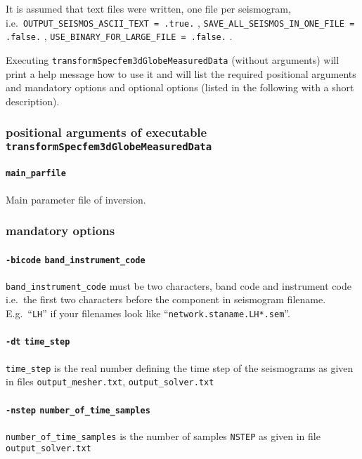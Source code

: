 \documentclass[12pt,a4paper]{article}
\newcommand{\lcode}[1]{\nolinkurl{#1}}
\begin{document}
It is assumed that text files were written, one file per seismogram, 
i.e.\ \lcode{OUTPUT_SEISMOS_ASCII_TEXT = .true.} , \lcode{SAVE_ALL_SEISMOS_IN_ONE_FILE = .false.} , 
\lcode{USE_BINARY_FOR_LARGE_FILE = .false.} .

Executing \lcode{transformSpecfem3dGlobeMeasuredData} (without arguments) 
will print a help message how to use it and will list the required positional 
arguments and mandatory options and optional options (listed in the following with a short description).

\subsubsection*{positional arguments of executable \lcode{transformSpecfem3dGlobeMeasuredData}}
\paragraph{\lcode{main_parfile}}
Main parameter file of inversion.
\subsubsection*{mandatory options}
\paragraph{\lcode{-bicode} \lcode{band_instrument_code}}
\lcode{band_instrument_code} must be two characters, band code and instrument code
i.e.\ the first two characters before the component in seismogram filename.
E.g.\ ``\lcode{LH}'' if your filenames look like ``\lcode{network.staname.LH*.sem}''.
\paragraph{\lcode{-dt} \lcode{time_step}}
\lcode{time_step} is the real number defining the time step of the seismograms as 
given in files \lcode{output_mesher.txt}, \lcode{output_solver.txt}
\paragraph{\lcode{-nstep} \lcode{number_of_time_samples}}
\lcode{number_of_time_samples} is the number of samples \lcode{NSTEP} as
given in file \lcode{output_solver.txt}
\end{document}
